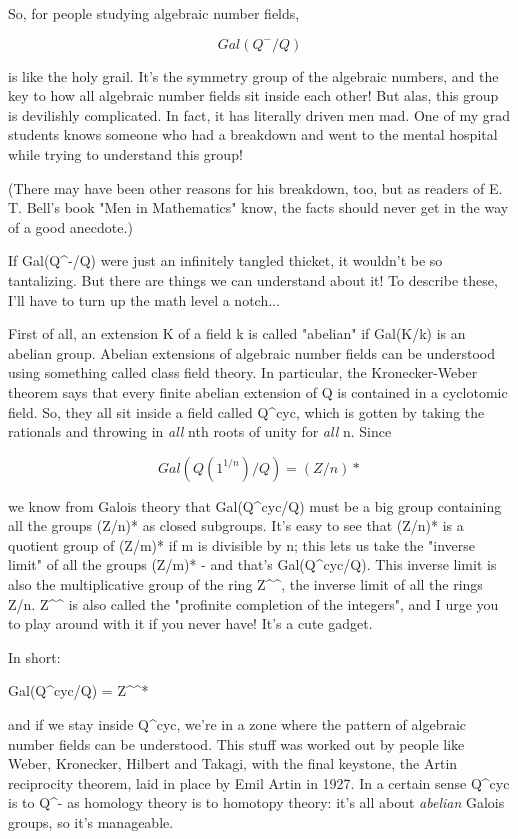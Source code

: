 So, for people studying algebraic number fields,


$$

                           Gal(Q^{-}/Q)
$$
    
is like the holy grail.  It's the symmetry group of the algebraic numbers, 
and the key to how all algebraic number fields sit inside each other!
But alas, this group is devilishly complicated.  In fact, it has literally 
driven men mad.  One of my grad students knows someone who had a breakdown 
and went to the mental hospital while trying to understand this group!

(There may have been other reasons for his breakdown, too, but as readers
of E. T. Bell's book "Men in Mathematics" know, the facts should never get
in the way of a good anecdote.)  

If Gal(Q^{-}/Q) were just an infinitely tangled thicket, it wouldn't be so 
tantalizing.  But there are things we can understand about it!  To describe
these, I'll have to turn up the math level a notch...

First of all, an extension K of a field k is called "abelian" if Gal(K/k) 
is an abelian group.  Abelian extensions of algebraic number fields can be
understood using something called class field theory.  In particular, the 
Kronecker-Weber theorem says that every finite abelian extension of Q is 
contained in a cyclotomic field.  So, they all sit inside a field called
Q^{cyc}, which is gotten by taking the rationals and throwing in \emph{all} nth 
roots of unity for \emph{all} n.  Since


$$

Gal(Q(1^{1/n})/Q) = (Z/n)*
$$
    
we know from Galois theory that Gal(Q^{cyc}/Q) must be a big group containing 
all the groups (Z/n)* as closed subgroups.  It's easy to see that (Z/n)* is
a quotient group of (Z/m)* if m is divisible by n; this lets us take the 
"inverse limit" of all the groups (Z/m)* - and that's Gal(Q^{cyc}/Q).  This 
inverse limit is also the multiplicative group of the ring Z^{^}, the inverse 
limit of all the rings Z/n.  Z^{^} is also called the "profinite completion of 
the integers", and I urge you to play around with it if you never have!  
It's a cute gadget.

In short:

Gal(Q^{cyc}/Q) = Z^{^}*

and if we stay inside Q^{cyc}, we're in a zone where the pattern of algebraic
number fields can be understood.  This stuff was worked out by people like
Weber, Kronecker, Hilbert and Takagi, with the final keystone, the Artin
reciprocity theorem, laid in place by Emil Artin in 1927.  In a certain 
sense Q^{cyc} is to Q^{-} as homology theory is to homotopy theory: it's all 
about \emph{abelian} Galois groups, so it's manageable.  

